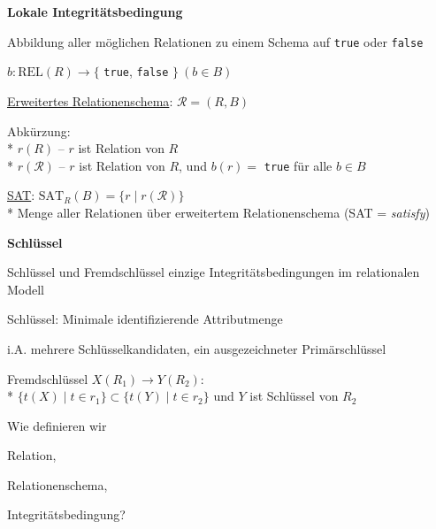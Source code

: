 \textbf{Lokale Integritätsbedingung}
\begin{items}
	\item Abbildung aller möglichen Relationen zu einem Schema auf \lstinline{true} oder \lstinline{false}
	\item \( b: \text{REL}(R) \to \{ \) \lstinline{true}, \lstinline{false} \( \} \ (b \in B) \)
	\item \underline{Erweitertes Relationenschema}: \( \mathcal{R} = (R, B) \)
	\item Abkürzung: \\* \( r(R) \) -- \( r \) ist Relation von \( R \) \\* \( r(\mathcal{R}) \) -- \( r \) ist Relation von \( R \), und \( b(r)= \) \lstinline{true} für alle \( b \in B \)
	\item \underline{SAT}: \( \text{SAT}_R(B) = \{ r \mid r(\mathcal{R}) \} \) \\* Menge aller Relationen über erweitertem Relationenschema (SAT = \emph{satisfy})
\end{items}

\textbf{Schlüssel}
\begin{items}
	\item Schlüssel und Fremdschlüssel einzige Integritätsbedingungen im relationalen Modell
	\item Schlüssel: Minimale identifizierende Attributmenge
	\item i.A. mehrere Schlüsselkandidaten, ein ausgezeichneter Primärschlüssel
	\item Fremdschlüssel \( X(R_1) \to Y(R_2) \): \\*
	\( \{ t(X) \mid t \in r_1 \} \subset \{ t(Y) \mid t \in r_2 \}  \) und $Y$ ist Schlüssel von $R_2$
\end{items}

\begin{fragen}
	\begin{enumeration}
		\item Wie definieren wir
		\begin{enumeration}
			\item Relation,	
			\item Relationenschema,
			\item Integritätsbedingung?
		\end{enumeration}
	\end{enumeration}
\end{fragen}